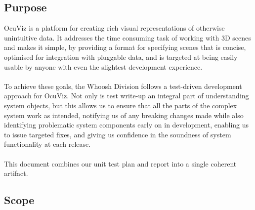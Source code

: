 \documentclass[a4paper,12pt]{article}
\begin{document}
\subsection{Purpose}
	OcuViz is a platform for creating rich visual representations of otherwise unintuitive data. It addresses the time consuming task of working with 3D scenes and makes it simple, by providing a format for specifying scenes that is concise, optimised for integration with pluggable data, and is targeted at being easily usable by anyone with even the slightest development experience.\\\\
	To achieve these goals, the Whoosh Division follows a test-driven development approach for OcuViz. Not only is test write-up an integral part of understanding system objects, but this allows us to ensure that all the parts of the complex system work as intended, notifying us of any breaking changes made while also identifying problematic system components early on in development, enabling us to issue targeted fixes, and giving us confidence in the soundness of system functionality at each release.\\\\
	This document combines our unit test plan and report into a single coherent artifact.
\subsection{Scope}
\end{document}
